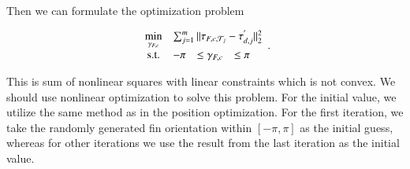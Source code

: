 Then we can formulate the optimization problem 

\begin{equation}
\begin{array}{ccclcl}
\displaystyle \min_{\gamma_{F,c}} & \multicolumn{3}{l}{\sum_{j=1}^{m}||\vec{\tau}_{F,c,\mathcal{T}_{j}}-\vec{\tau}_{d,j}^{'}||^{2}_{2}} \\
\textrm{s.t.}
& -\pi&\leq \gamma_{F,c} & \leq \pi 
\end{array}. \label{EQ:FinOrtOpt}
\end{equation}

This is sum of nonlinear squares with linear constraints which is not convex. We should use nonlinear optimization to solve this problem. For the initial value, we utilize the same method as in the position optimization. For the first iteration, we take the randomly generated fin orientation within $[-\pi, \pi]$ as the initial guess, whereas for other iterations we use the result from the last iteration as the initial value.

